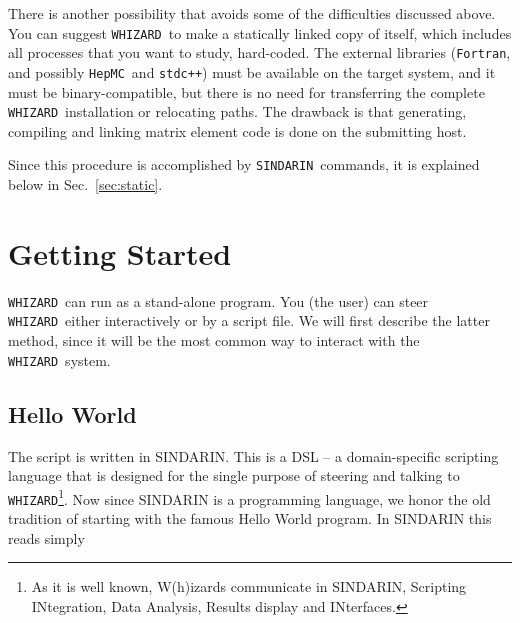 \documentclass[12pt]{book}
\newcommand{\ttt}[1]{\texttt{#1}}
\newcommand{\whizard}{\texttt{WHIZARD}}
\newcommand{\hepmc}{\texttt{HepMC}}
\newcommand{\sindarin}{\texttt{SINDARIN}}
\newcommand{\fortran}{\texttt{Fortran}}
\begin{document}
There is another possibility that avoids some of the difficulties
discussed above.  You can suggest \whizard\ to make a statically
linked copy of itself, which includes all processes that you want to
study, hard-coded.  The external libraries (\fortran, and possibly
\hepmc\ and \ttt{stdc++}) must be available on the target system, and
it must be binary-compatible, but there is no need for transferring
the complete \whizard\ installation or relocating paths.  The drawback
is that generating, compiling and linking matrix element code is done
on the submitting host.

Since this procedure is accomplished by \sindarin\ commands, it is
explained below in Sec.~\ref{sec:static}.




\clearpage

\chapter{Getting Started}
\label{sec:start}

\whizard\ can run as a stand-alone program.  You (the user) can steer
\whizard\ either interactively or by a script file.  We will first
describe the latter method, since it will be the most common way to
interact with the \whizard\ system.

\section{Hello World}

The script is written in SINDARIN.  This is a DSL -- a domain-specific
scripting language that is designed for the single purpose of steering and
talking to \whizard\footnote{As it is well known, W(h)izards communicate in
  SINDARIN, Scripting INtegration, Data Analysis, Results display and
  INterfaces.}.  Now since SINDARIN is a programming language, we honor the old
tradition of starting with the famous Hello World program.  In SINDARIN this
reads simply

\end{document}
